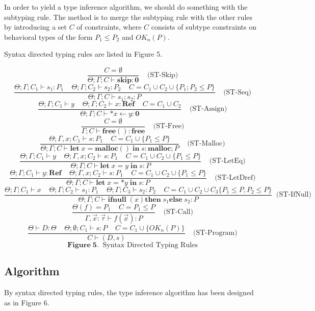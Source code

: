\documentclass[english]{jssst_ppl} %
\newcommand\LET{\mathbf{let}\;}
\newcommand\IN{\mathbf{in}\;}
\newcommand\SKIP{\mathbf{skip}}
\newcommand\Rtab{\; \; \; \;}
\newcommand\IFNULL{\mathbf{ifnull}\;}
\newcommand\THEN{\mathbf{then}\;}
\newcommand\ELSE{\mathbf{else}\;}
\newcommand\Malloc{\mathbf{malloc}}
\newcommand\Free{\mathbf{free}}
\newcommand\Cirx{(x)}
\begin{document}
In order to yield a type inference algorithm, we should do something with the subtyping rule. The method is to merge the subtyping rule with the other rules by introducing a set $C$ of constraints, where $C$ consists of subtype constraints on behavioral types of the form $P_{1}\le P_{2}$ and $OK_{n}(P)$.

Syntax directed typing rules are listed in Figure 5.

$$
     \frac{ C = \emptyset}
           {\Theta; \Gamma; C \vdash \SKIP : \mathbf{0}}
      \Rtab \mbox{(ST-Skip)}
$$
$$
      \frac{\Theta;\Gamma ; C_{1} \vdash s_{1} : P_{1} \Rtab \Theta; \Gamma ; C_{2} \vdash s_{2} : P_{2} \Rtab C = C_{1}\cup C_{2} \cup \{ P_{1};P_{2} \le P\}}
      {\Theta;\Gamma; C \vdash s_{1};s_{2} : P}
      \Rtab \mbox{(ST-Seq)}
$$
$$
      \frac{\Theta;\Gamma;C_{1} \vdash y \Rtab \Theta;\Gamma; C_{2} \vdash x : \mathbf{Ref} \Rtab C = C_{1}\cup C_{2}}
      {\Theta;\Gamma; C \vdash *x \leftarrow y : \mathbf{0}}
      \Rtab \mbox{(ST-Assign)}
$$
$$
      \frac{C = \emptyset}
      {\Gamma ; C \vdash \Free() : \Free}
     \Rtab \mbox{(ST-Free)}
$$
$$
     \frac{\Theta;\Gamma, x ; C_{1} \vdash s : P_{1} \Rtab C = C_{1} \cup\{P_{1}\le P\}}
     {\Theta;\Gamma; C \vdash \LET x = \Malloc() \; \IN s : \Malloc ; P}
     \Rtab \mbox{(ST-Malloc)}
$$
$$
     \frac{\Theta;\Gamma; C_{1} \vdash y \Rtab \Theta;\Gamma, x ; C_{2} \vdash s : P_{1} \Rtab C = C_{1}\cup C_{2} \cup \{P_{1} \le P \}}
     {\Theta;\Gamma ; C \vdash \LET x = y \;  \IN s : P}
     \Rtab \mbox{(ST-LetEq)}
$$
$$
     \frac{\Theta;\Gamma ; C_{1} \vdash y: \mathbf{Ref} \Rtab \Theta;\Gamma, x ; C_{2} \vdash s : P_{1} \Rtab C = C_{1}\cup C_{2}\cup\{P_{1} \le P\}}
     {\Theta;\Gamma ; C \vdash \LET x = *y \; \IN s : P}
     \Rtab \mbox{(ST-LetDref)}
$$
$$
     \frac{\Theta;\Gamma; C_{1} \vdash x \Rtab \Theta;\Gamma; C_{2} \vdash s_{1} : P_{1} \Rtab \Theta;\Gamma; C_{3} \vdash s_{2} : P_{2}  \Rtab  C = C_{1} \cup C_{2} \cup C_{3} \{P_{1}\le P, P_{2}\le P \}}
     {\Theta;\Gamma; C \vdash \IFNULL\Cirx \THEN s_{1} \ELSE s_{2} : P }
    \; \;  \mbox{(ST-IfNull)}
$$
$$
     \frac{\Theta(f) = P_{1} \Rtab C = P_{1} \le P}
     {\Gamma,\vec{x}:\vec{\tau} \vdash f(\vec{x}) : P }
     \Rtab \mbox{(ST-Call)}
$$
$$
     \frac{\Theta \vdash D : \Theta \Rtab \Theta ; \emptyset ; C_{1} \vdash s : P \Rtab C = C_{1}\cup\{OK_{n}(P)\}}
     {C \vdash (D , s) }
     \Rtab \mbox{(ST-Program)}
$$
$$
    \mathbf{Figure \; 5.} \;\; \mbox{Syntax Directed Typing Rules}
$$
\subsection{Algorithm}
By syntax directed typing rules, the type inference algorithm has been designed as in Figure 6.
\end{document}
